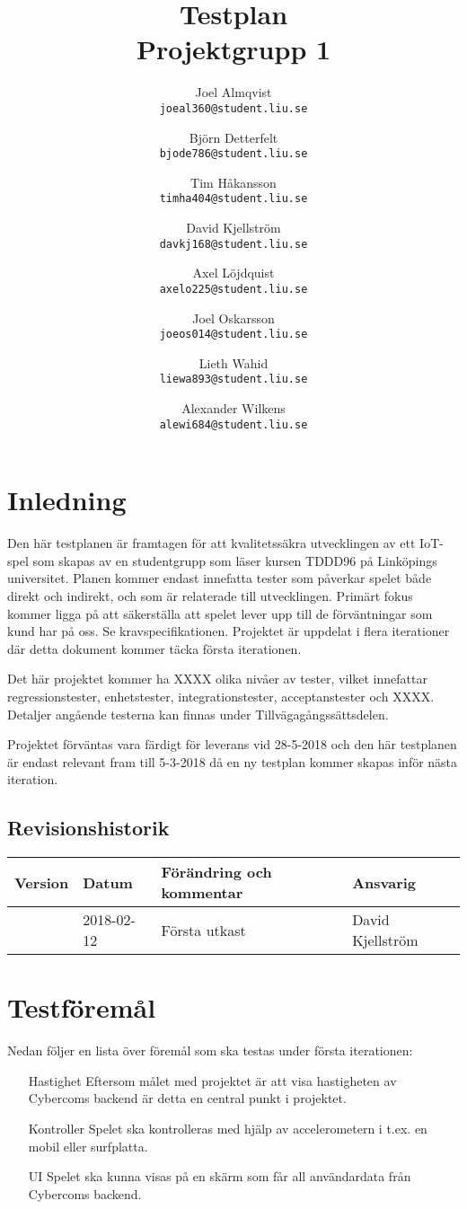 \documentclass[10pt]{article}
\title{Testplan\\
  \large Projektgrupp 1}
\author{
    Joel Almqvist\\
    \texttt{joeal360@student.liu.se}
    \and
    Björn Detterfelt\\
    \texttt{bjode786@student.liu.se}
    \and
    Tim Håkansson\\
    \texttt{timha404@student.liu.se}
    \and
    David Kjellström\\
    \texttt{davkj168@student.liu.se}
    \and
    Axel Löjdquist\\
    \texttt{axelo225@student.liu.se}
    \and
    Joel Oskarsson\\
    \texttt{joeos014@student.liu.se}
    \and
    Lieth Wahid\\
    \texttt{liewa893@student.liu.se}
    \and
    Alexander Wilkens\\
    \texttt{alewi684@student.liu.se}
}
\begin{document}
\maketitle
\pagebreak
\tableofcontents
\pagebreak
{}
\section{Inledning}
	Den här testplanen är framtagen för att kvalitetssäkra utvecklingen av ett IoT-spel som skapas av en studentgrupp som läser kursen TDDD96 på Linköpings universitet. Planen kommer endast innefatta tester som påverkar spelet både direkt och indirekt, och som är relaterade till utvecklingen. Primärt fokus kommer ligga på att säkerställa att spelet lever upp till de förväntningar som kund har på oss. Se kravspecifikationen. Projektet är uppdelat i flera iterationer där detta dokument kommer täcka första iterationen.

Det här projektet kommer ha {\color{red}XXXX} olika nivåer av tester, vilket innefattar regressionstester, enhetstester, integrationstester, acceptanstester och {\color{red}XXXX}. Detaljer angående testerna kan finnas under Tillvägagångssättsdelen.

Projektet förväntas vara färdigt för leverans vid {\color{red}28-5-2018} och den här testplanen är endast relevant fram till {\color{red}5-3-2018} då en ny testplan kommer skapas inför nästa iteration.

	\subsection{Revisionshistorik}

	
	\begin{center}
 	   \begin{tabular}{| l | l | l |  l | }
 	       \hline
 	       \textbf{Version} & \textbf{Datum} & \textbf{Förändring och kommentar} & \textbf{Ansvarig} \\
 	       \hline
 	       \centering 0.1 & 2018-02-12 & Första utkast & David Kjellström\\
 	       \hline
 	   \end{tabular}
	\end{center}


  
	
\section{Testföremål}
	Nedan följer en lista över föremål som ska testas under första iterationen:
	\begin{itemize}
	\item [Hastighet] Eftersom målet med projektet är att visa hastigheten av Cybercoms backend är detta en central punkt i projektet.
	\item [Kontroller] Spelet ska kontrolleras med hjälp av accelerometern i t.ex. en mobil eller surfplatta.
	\item [UI] Spelet ska kunna visas på en skärm som får all användardata från Cybercoms backend.
	\end{itemize}
	
\end{document}
